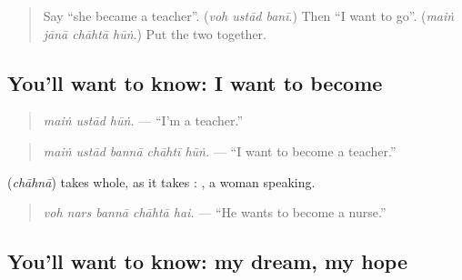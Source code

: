 \label{lesson:UR-C272-banna-chahti-hun}



\begin{quote}
Say \textquotedblleft{}she became a teacher\textquotedblright{}. (\emph{voh ustād banī}.) Then \textquotedblleft{}I want to go\textquotedblright{}. (\emph{maiṅ jānā chāhtā hūṅ}.) Put the two together.
\end{quote}

\subsection*{You'll want to know: I want to become}
\begin{quote}
\textbf{  }
\end{quote}

\begin{quote}
\emph{maiṅ ustād hūṅ.} — \textquotedblleft{}I'm a teacher.\textquotedblright{}
\end{quote}

\begin{quote}
\textbf{    }
\end{quote}

\begin{quote}
\emph{maiṅ ustād bannā chāhtī hūṅ.} — \textquotedblleft{}I want to become a teacher.\textquotedblright{}
\end{quote}

\textbf{} (\emph{chāhnā}) takes \textbf{} whole, as it takes \textbf{}: \textbf{  }, a woman speaking.

\begin{quote}
\textbf{    }
\end{quote}

\begin{quote}
\emph{voh nars bannā chāhtā hai.} — \textquotedblleft{}He wants to become a nurse.\textquotedblright{}
\end{quote}

\subsection*{You'll want to know: my dream, my hope}
\begin{quote}
\textbf{    }
\end{quote}

